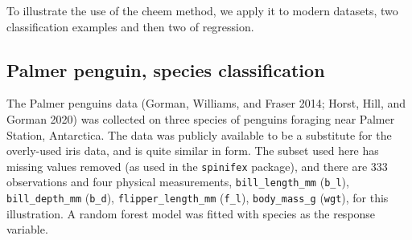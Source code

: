 \documentclass[
]{article}
\begin{document}
To illustrate the use of the cheem method, we apply it to modern datasets, two classification examples and then two of regression.

\hypertarget{palmer-penguin-species-classification}{%
\subsection{Palmer penguin, species classification}\label{palmer-penguin-species-classification}}

The Palmer penguins data (Gorman, Williams, and Fraser 2014; Horst, Hill, and Gorman 2020) was collected on three species of penguins foraging near Palmer Station, Antarctica. The data was publicly available to be a substitute for the overly-used iris data, and is quite similar in form. The subset used here has missing values removed (as used in the \texttt{spinifex} package), and there are 333 observations and four physical measurements, \texttt{bill\_length\_mm} (\texttt{b\_l}), \texttt{bill\_depth\_mm} (\texttt{b\_d}), \texttt{flipper\_length\_mm} (\texttt{f\_l}), \texttt{body\_mass\_g} (\texttt{wgt}), for this illustration. A random forest model was fitted with species as the response variable.
\end{document}
